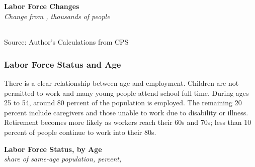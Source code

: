 \documentclass{report}
\newcommand{\abar}[4]{
		\addplot[stack plots=y, area style, draw=none, fill=#1] 
			table [x=#2, y=#3, col sep=comma]{#4}\closedcycle;}
\newcommand{\stdnode}[3]{\node[below, align=left, shift=({#1,#2})]{#3};}
\begin{document}
{\begin{minipage}{0.76\textwidth}
\normalsize \textbf{Labor Force Changes}\\
\footnotesize{\textit{Change from \unskip, thousands of people}}\\
\noindent {} \setlength{\tabcolsep}{3.0pt} \color{black!90}
		{\renewcommand{\arraystretch}{1.5}
		 \begin{tabular}{p{27.8mm} R{11.2mm} R{10.4mm} R{10.4mm} R{10.2mm} 
		 				 R{10.6mm} R{10.4mm} R{10.4mm}}
			  \hline
		\end{tabular}}
		\vspace{-3mm}
		
\footnotesize{Source: Author's Calculations from CPS}
\end{minipage}
\newpage
\begin{minipage}{0.76\textwidth}
\subsubsection*{Labor Force Status and Age} 
\small There is a clear relationship between age and employment. Children are not permitted to work and many young people attend school full time. During ages 25 to 54, around 80 percent of the population is employed. The remaining 20 percent include caregivers and those unable to work due to disability or illness. Retirement becomes more likely as workers reach their 60s and 70s; less than 10 percent of people continue to work into their 80s. 
\vspace{1mm}

\normalsize \textbf{Labor Force Status, by Age}\\
\footnotesize{\textit{share of same-age population, percent, }}\\
\hspace*{-3mm} 
\vspace{-1mm}


\end{minipage}}
\end{document}
